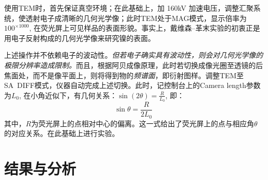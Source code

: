 \documentclass[aps,pre,12pt,preprint,%
	onecolumn,showpacs,showkeys,nofootinbib]{revtex4-2}
\begin{document}
	使用TEM时，首先保证真空环境；在此基础上，加 160kV 加速电压，调整汇聚系统，使透射电子成清晰的几何光学像；此时TEM处于MAG模式，显示倍率为$100^{\times 1000}$, 在荧光屏上可见样品的表面形貌。事实上，戴维森--革末实验的初衷正是用电子反射构成的几何光学像来研究镍的表面\supercite{davisson1927diffraction}。
	
	上述操作并不依赖电子的波动性。\textit{但若电子确实具有波动性，则会对几何光学像的极限分辨率造成限制。}而且，根据阿贝成像原理，此时若切换成像光圈至透镜的后焦面处，而不是像平面上，则将得到物的\textit{频谱面}，即衍射图样。调整TEM至SA~DIFF模式，仪器自动完成上述切换。此时，记控制台上的Camera length参数为$L_0$, 在小角近似下，有几何关系：$\sin(2\theta) = \frac{R}{L_0}$, 即：
	\begin{equation}
		\sin\theta = \frac{R}{2L_0}
		\label{eq:GeoRelation}
	\end{equation}
	其中，$R$为荧光屏上的点相对中心的偏离。这一式给出了荧光屏上的点与相应角$\theta$的对应关系。在此基础上进行实验。
\section{结果与分析}
%	
%	
\end{document}
